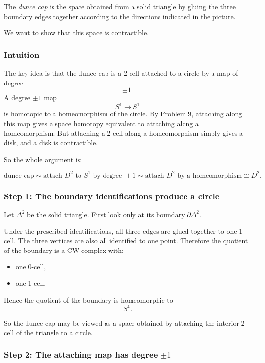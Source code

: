 \documentclass[12pt,a4paper]{article}
\theoremstyle{notespace}
\begin{document}
The \emph{dunce cap} is the space obtained from a solid triangle by gluing the three boundary edges together according to the directions indicated in the picture.

We want to show that this space is contractible.

\subsubsection{Intuition}

The key idea is that the dunce cap is a 2-cell attached to a circle by a map of degree
\[
\pm 1.
\]
A degree \(\pm 1\) map
\[
S^1\to S^1
\]
is homotopic to a homeomorphism of the circle. By Problem 9, attaching along this map gives a space homotopy equivalent to attaching along a homeomorphism. But attaching a 2-cell along a homeomorphism simply gives a disk, and a disk is contractible.

So the whole argument is:

\[
\text{dunce cap}
\sim
\text{attach }D^2\text{ to }S^1\text{ by degree }\pm1
\sim
\text{attach }D^2\text{ by a homeomorphism}
\cong
D^2.
\]

\subsubsection{Step 1: The boundary identifications produce a circle}

Let \(\Delta^2\) be the solid triangle. First look only at its boundary \(\partial \Delta^2\).

Under the prescribed identifications, all three edges are glued together to one 1-cell. The three vertices are also all identified to one point. Therefore the quotient of the boundary is a CW-complex with:

\begin{itemize}
	\item one 0-cell,
	\item one 1-cell.
\end{itemize}

Hence the quotient of the boundary is homeomorphic to
\[
S^1.
\]

So the dunce cap may be viewed as a space obtained by attaching the interior 2-cell of the triangle to a circle.

\subsubsection{Step 2: The attaching map has degree \(\pm1\)}
\end{document}
